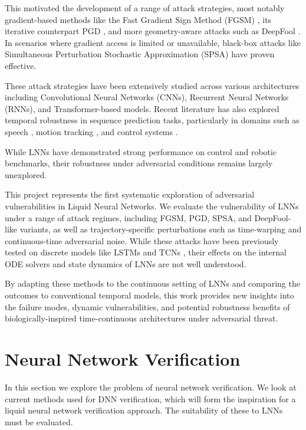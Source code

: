 This motivated the development of a range of attack strategies, most notably gradient-based methods like the Fast Gradient Sign Method (FGSM) \cite{goodfellow2014explaining}, its iterative counterpart PGD \cite{madry2018towards}, and more geometry-aware attacks such as DeepFool \cite{moosavi2016deepfool}. In scenarios where gradient access is limited or unavailable, black-box attacks like Simultaneous Perturbation Stochastic Approximation (SPSA) \cite{uesato2018adversarial} have proven effective.

These attack strategies have been extensively studied across various architectures including Convolutional Neural Networks (CNNs), Recurrent Neural Networks (RNNs), and Transformer-based models. Recent literature has also explored temporal robustness in sequence prediction tasks, particularly in domains such as speech \cite{cisse2017houdini}, motion tracking \cite{sun2018natural}, and control systems \cite{weng2018evaluating}.

While LNNs have demonstrated strong performance on control and robotic benchmarks, their robustness under adversarial conditions remains largely unexplored.

This project represents the first systematic exploration of adversarial vulnerabilities in Liquid Neural Networks. We evaluate the vulnerability of LNNs under a range of attack regimes, including FGSM, PGD, SPSA, and DeepFool-like variants, as well as trajectory-specific perturbations such as time-warping and continuous-time adversarial noise. While these attacks have been previously tested on discrete models like LSTMs and TCNs \cite{dong2020benchmarking}, their effects on the internal ODE solvers and state dynamics of LNNs are not well understood.

By adapting these methods to the continuous setting of LNNs and comparing the outcomes to conventional temporal models, this work provides new insights into the failure modes, dynamic vulnerabilities, and potential robustness benefits of biologically-inspired time-continuous architectures under adversarial threat.

\section{Neural Network Verification}

In this section we explore the problem of neural network verification. We look at current methods used for DNN verification, which will form the inspiration for a liquid neural network verification approach. The suitability of these to LNNs must be evaluated.

